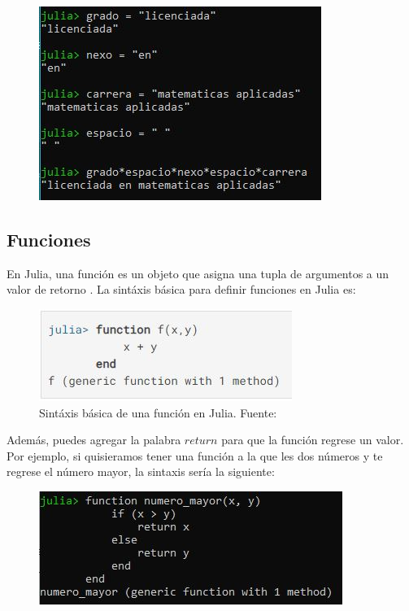 \begin{figure}[h]
\begin{center}
\includegraphics[scale=0.8]{Imagenes/ejemplo_concatenacion.JPG}
  \label{ejemplo_string_concatenacion}
\end{center}
\end{figure}

\subsection{Funciones}
En Julia, una función es un objeto que asigna una tupla de argumentos a un valor de retorno \cite{Julia_manual}. La sintáxis básica para definir funciones en Julia es:

\begin{figure}[h]
\begin{center}
\includegraphics[scale=0.6]{Imagenes/sintaxis_funcion.JPG}
 \caption{Sintáxis básica de una función en Julia. Fuente: \cite{Julia_manual}}
  \label{functions_sintax_Julia}
\end{center}
\end{figure}

Además, puedes agregar la palabra $return$ para que la función regrese un valor. Por ejemplo, si quisieramos tener una función a la que les dos números y te regrese el número mayor, la sintaxis sería la siguiente:

\begin{figure}[h]
\begin{center}
\includegraphics[scale=0.8]{Imagenes/ejemplo_return.JPG}
  \label{ejemplo_return}
\end{center}
\end{figure}

